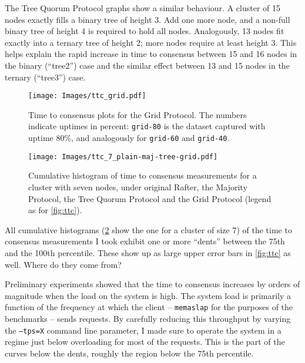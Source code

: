 \documentclass[12pt,chapterprefix=true,toc=bibliography,numbers=noendperiod,
               footnotes=multiple,twoside]{scrreprt}
\newcommand{\yes}{{\fontfamily{jkposn}\selectfont\textsc{Yes}}}
\begin{document}

The Tree Quorum Protocol graphs show a similar behaviour. A cluster of 15 nodes exactly fills a binary tree of height 3. Add one more node, and a non-full binary tree of height 4 is required to hold all nodes. Analogously, 13 nodes fit exactly into a ternary tree of height 2; more nodes require at least height 3. This helps explain the rapid increase in time to consensus between 15 and 16 nodes in the binary (\enquote{tree2}) case and the similar effect between 13 and 15 nodes in the ternary (\enquote{tree3}) case.

\begin{figure}[t]
    \centering
    \texttt{[image: Images/ttc\_grid.pdf]}
    \caption{Time to consensus plots for the Grid Protocol. The numbers indicate uptimes in percent: \texttt{grid-80} is the dataset captured with uptime 80\%, and analogously for \texttt{grid-60} and \texttt{grid-40}.}
    \label{fig:ttc-grid}
\end{figure}


\begin{figure}[p]
    \centering
    \texttt{[image: Images/ttc\_7\_plain-maj-tree-grid.pdf]}
    \caption{Cumulative histogram of time to consensus measurements for a cluster with seven nodes, under original Rafter, the Majority Protocol, the Tree Quorum Protocol and the Grid Protocol (legend as for \cref{fig:ttc}).}
    \label{fig:plain-maj-tree-grid-ttc}
\end{figure}

All cumulative histograms (\cref{fig:plain-maj-tree-grid-ttc} show the one for a cluster of size 7) of the time to consensus measurements I took exhibit one or more \enquote{dents} between the 75th and the 100th percentile. These show up as large upper error bars in \cref{fig:ttc} as well. Where do they come from?

Preliminary experiments showed that the time to consensus increases by orders of magnitude when the load on the system is high. The system load is primarily a function of the frequency at which the client -- \texttt{memaslap} for the purposes of the benchmarks -- sends requests. By carefully reducing this throughput by varying the \texttt{--tps=X} command line parameter, I made sure to operate the system in a regime just below overloading for most of the requests. This is the part of the curves below the dents, roughly the region below the 75th percentile.
\end{document}
